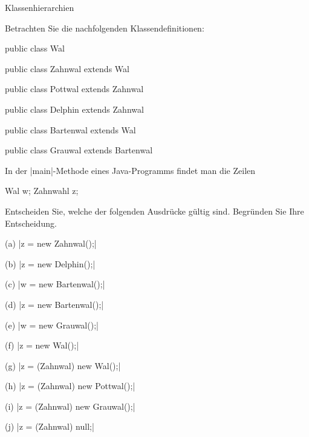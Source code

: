 
\begin{exercise}{Klassenhierarchien}
\begin{body}
Betrachten Sie die nachfolgenden Klassendefinitionen:
\medskip
\begin{displaycode}
public class Wal { }

public class Zahnwal extends Wal { }

public class Pottwal extends Zahnwal { }

public class Delphin extends Zahnwal { }

public class Bartenwal extends Wal { }

public class Grauwal extends Bartenwal { }
\end{displaycode}
\medskip
In der \code|main|-Methode eines Java-Programms findet man die Zeilen
\medskip
\begin{displaycode}
        Wal w;
        Zahnwahl z;
\end{displaycode}
\medskip
Entscheiden Sie, welche der folgenden Ausdrücke gültig sind. Begründen Sie Ihre Entscheidung.
\begin{center}
\begin{minipage}{0.45\textwidth}
\begin{parts}
\item[(a)]
\code|z = new Zahnwal();|

\item[(b)]
\code|z = new Delphin();|

\item[(c)]
\code|w = new Bartenwal();|

\item[(d)]
\code|z = new Bartenwal();|

\item[(e)]
\code|w = new Grauwal();|
\end{parts}
\end{minipage}
\begin{minipage}{0.45\textwidth}
\begin{parts}
\item[(f)]
\code|z = new Wal();|

\item[(g)]
\code|z = (Zahnwal) new Wal();|

\item[(h)]
\code|z = (Zahnwal) new Pottwal();|

\item[(i)]
\code|z = (Zahnwal) new Grauwal();|

\item[(j)]
\code|z = (Zahnwal) null;|
\end{parts}
\end{minipage}
\end{center}
\end{body}



\end{exercise}
